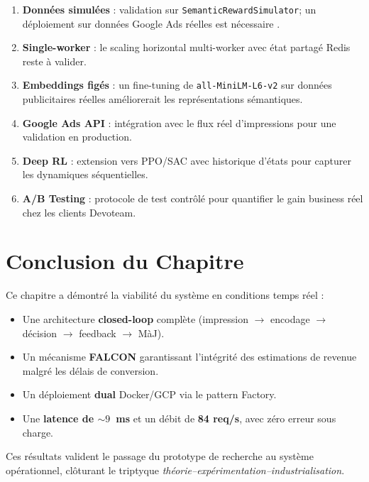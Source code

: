 \begin{enumerate}
    \item \textbf{Données simulées} : validation sur \texttt{SemanticRewardSimulator}; un déploiement sur données Google Ads réelles est nécessaire \parencite{chapelle2014simple}.
    \item \textbf{Single-worker} : le scaling horizontal multi-worker avec état partagé Redis reste à valider.
    \item \textbf{Embeddings figés} : un fine-tuning de \texttt{all-MiniLM-L6-v2} \parencite{reimers2019sentence} sur données publicitaires réelles améliorerait les représentations sémantiques.
    \item \textbf{Google Ads API} : intégration avec le flux réel d'impressions pour une validation en production.
    \item \textbf{Deep RL} : extension vers PPO/SAC avec historique d'états pour capturer les dynamiques séquentielles.
    \item \textbf{A/B Testing} : protocole de test contrôlé pour quantifier le gain business réel chez les clients Devoteam.
\end{enumerate}

\section*{Conclusion du Chapitre}

Ce chapitre a démontré la viabilité du système en conditions temps réel :
\begin{itemize}
    \item Une architecture \textbf{closed-loop} complète (impression $\to$ encodage $\to$ décision $\to$ feedback $\to$ MàJ).
    \item Un mécanisme \textbf{FALCON} garantissant l'intégrité des estimations de revenue malgré les délais de conversion.
    \item Un déploiement \textbf{dual} Docker/GCP via le pattern Factory.
    \item Une \textbf{latence de $\sim9$~ms} et un débit de \textbf{84 req/s}, avec zéro erreur sous charge.
\end{itemize}

Ces résultats valident le passage du prototype de recherche au système opérationnel, clôturant le triptyque \textit{théorie--expérimentation--industrialisation}.
